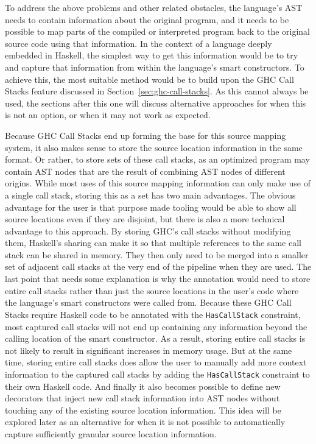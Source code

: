 \documentclass[fontsize=11pt,a4paper,parskip=half,numbers=noenddot]{scrartcl}
\newcommand{\hask}[1]{\texttt{#1}}
\begin{document}
To address the above problems and other related obstacles, the language's AST
needs to contain information about the original program, and it needs to be
possible to map parts of the compiled or interpreted program back to the
original source code using that information. In the context of a language deeply
embedded in Haskell, the simplest way to get this information would be to try
and capture that information from within the language's smart constructors. To
achieve this, the most suitable method would be to build upon the GHC Call
Stacks feature discussed in Section~\ref{sec:ghc-call-stacks}. As this cannot
always be used, the sections after this one will discuss alternative approaches
for when this is not an option, or when it may not work as expected.

Because GHC Call Stacks end up forming the base for this source mapping system,
it also makes sense to store the source location information in the same format.
Or rather, to store sets of these call stacks, as an optimized program may
contain AST nodes that are the result of combining AST nodes of different
origins. While most uses of this source mapping information can only make use of
a single call stack, storing this as a set has two main advantages. The obvious
advantage for the user is that purpose made tooling would be able to show all
source locations even if they are disjoint, but there is also a more technical
advantage to this approach. By storing GHC's call stacks without modifying them,
Haskell's sharing can make it so that multiple references to the same call stack
can be shared in memory. They then only need to be merged into a smaller set of
adjacent call stacks at the very end of the pipeline when they are used. The
last point that needs some explanation is why the annotation would need to store
entire call stacks rather than just the source locations in the user's code
where the language's smart constructors were called from. Because these GHC Call
Stacks require Haskell code to be annotated with the \hask{HasCallStack}
constraint, most captured call stacks will not end up containing any information
beyond the calling location of the smart constructor. As a result, storing
entire call stacks is not likely to result in significant increases in memory
usage. But at the same time, storing entire call stacks does allow the user to
manually add more context information to the captured call stacks by adding the
\hask{HasCallStack} constraint to their own Haskell code. And finally it also
becomes possible to define new decorators that inject new call stack information
into AST nodes without touching any of the existing source location information.
This idea will be explored later as an alternative for when it is not possible
to automatically capture sufficiently granular source location information.
\end{document}
